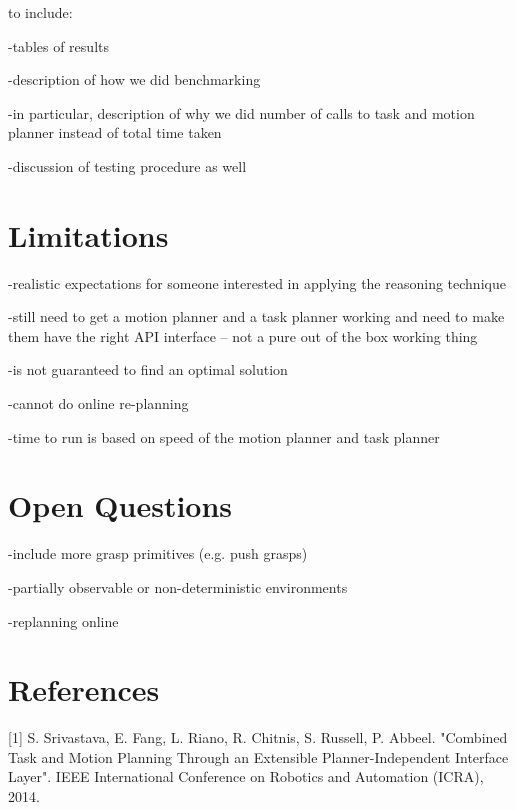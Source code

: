 \documentclass[12pt]{article}
\begin{document}
to include:

-tables of results

-description of how we did benchmarking

-in particular, description of why we did number of calls to task and motion planner instead of total time taken

-discussion of testing procedure as well

\section{Limitations}

-realistic expectations for someone interested in applying the reasoning technique

-still need to get a motion planner and a task planner working and need to make them have the right API interface -- not a pure out of the box working thing

-is not guaranteed to find an optimal solution

-cannot do online re-planning

-time to run is based on speed of the motion planner and task planner

\section{Open Questions}

-include more grasp primitives (e.g. push grasps)

-partially observable or non-deterministic environments

-replanning online

\section{References}

[1] S. Srivastava, E. Fang, L. Riano, R. Chitnis, S. Russell, P. Abbeel. "Combined Task and Motion Planning Through an Extensible Planner-Independent Interface Layer". IEEE International Conference on Robotics and Automation (ICRA), 2014.
\end{document}
